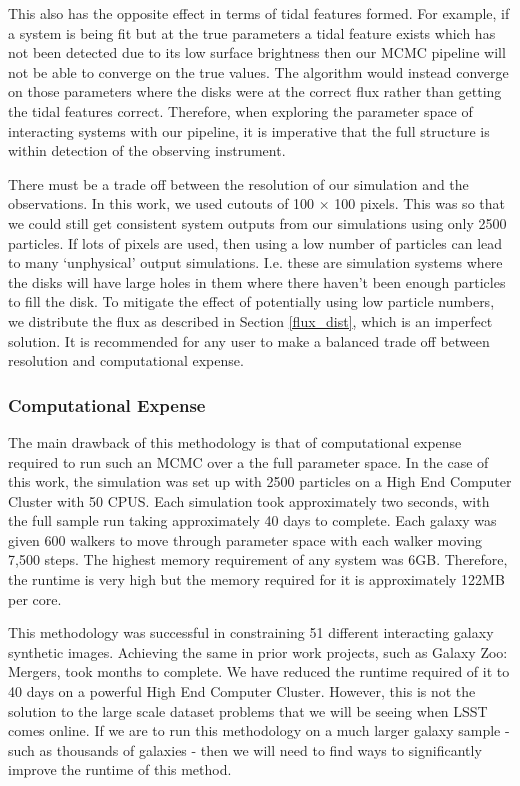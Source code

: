 This also has the opposite effect in terms of tidal features formed. For example, if a system is being fit but at the true parameters a tidal feature exists which has not been detected due to its low surface brightness then our MCMC pipeline will not be able to converge on the true values. The algorithm would instead converge on those parameters where the disks were at the correct flux rather than getting the tidal features correct. Therefore, when exploring the parameter space of interacting systems with our pipeline, it is imperative that the full structure is within detection of the observing instrument.

There must be a trade off between the resolution of our simulation and the observations. In this work, we used cutouts of 100 $\times$ 100 pixels. This was so that we could still get consistent system outputs from our simulations using only 2500 particles. If lots of pixels are used, then using a low number of particles can lead to many `unphysical' output simulations. I.e. these are simulation systems where the disks will have large holes in them where there haven't been enough particles to fill the disk. To mitigate the effect of potentially using low particle numbers, we distribute the flux as described in Section \ref{flux_dist}, which is an imperfect solution. It is recommended for any user to make a balanced trade off between resolution and computational expense.

\subsubsection{Computational Expense}\label{computational_expense}
\noindent The main drawback of this methodology is that of computational expense required to run such an MCMC over a the full parameter space. In the case of this work, the simulation was set up with 2500 particles on a High End Computer Cluster with 50 CPUS. Each simulation took approximately two seconds, with the full sample run taking approximately 40 days to complete. Each galaxy was given 600 walkers to move through parameter space with each walker moving 7,500 steps. The highest memory requirement of any system was 6GB. Therefore, the runtime is very high but the memory required for it is approximately 122MB per core.

This methodology was successful in constraining 51 different interacting galaxy synthetic images. Achieving the same in prior work projects, such as Galaxy Zoo: Mergers, took months to complete. We have reduced the runtime required of it to 40 days on a powerful High End Computer Cluster. However, this is not the solution to the large scale dataset problems that we will be seeing when LSST comes online. If we are to run this methodology on a much larger galaxy sample - such as thousands of galaxies - then we will need to find ways to significantly improve the runtime of this method.

